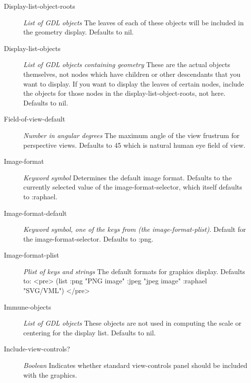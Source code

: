\documentclass [11pt]{book}
\begin{document}
\begin{itemize}
\begin{description}
\item [Display-list-object-roots]
\emph{List of GDL objects} The leaves of each of these objects will
be included in the geometry display. Defaults to nil.


\item [Display-list-objects]
\emph{List of GDL objects containing geometry} These are the
actual objects themselves, not nodes which have children or
other descendants that you want to display. If you want to
display the leaves of certain nodes, include the objects for
those nodes in the display-list-object-roots, not here.
Defaults to nil.


\item [Field-of-view-default]
\emph{Number in angular degrees} The maximum angle of the view frustrum
for perspective views. Defaults to 45 which is natural human eye field of view.


\item [Image-format]
\emph{Keyword symbol} Determines the default image format. Defaults to the currently selected
value of the image-format-selector, which itself defaults to :raphael.


\item [Image-format-default]
\emph{Keyword symbol, one of the keys from (the image-format-plist)}.
Default for the image-format-selector. Defaults to :png.


\item [Image-format-plist]
\emph{Plist of keys and strings} The default formats for graphics display. Defaults to:
 <pre>
 (list :png "PNG image"
       :jpeg "jpeg image"
       :raphael "SVG/VML")
</pre>


\item [Immune-objects]
\emph{List of GDL objects} These objects are not used in
computing the scale or centering for the display list.
Defaults to nil.


\item [Include-view-controls?]
\emph{Boolean} Indicates whether standard view-controls panel should be included with the graphics.



\end{description}
\end{itemize}
\end{document}
